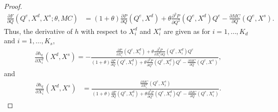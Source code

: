 \documentclass[11pt, a4paper]{article}
\theoremstyle{remark}
\begin{document}
\begin{proof}
\begin{align}
    \frac{\partial F}{\partial Q}(Q^e, X^{d}, X^{s}; \theta, MC) & = (1+\theta)\frac{\partial P}{\partial Q}(Q^e, X^{d}) + \theta\frac{\partial^2 P}{\partial Q^2}(Q^e, X^{d})Q^e - \frac{\partial MC}{\partial Q}(Q^e, X^{s}).
\end{align}
Thus, the derivative of $h$ with respect to $X^{d}_i$ and $X^{s}_i$ are given as for $i = 1, \ldots, K_d$ and $i = 1, \ldots, K_s$,
\begin{align}
    \frac{\partial h_q}{\partial X^{d}_{i}}(X^{d}, X^{s}) = -\frac{\frac{\partial P}{\partial X^{d}_{i}}(Q^e, X^{d}_i) + \theta\frac{\partial^2 P}{\partial X^{d}_{i}\partial Q}(Q^e, X^{d}_i)Q^e }{(1+\theta)\frac{\partial P}{\partial Q}(Q^e, X^{d}_i) + \theta\frac{\partial^2 P}{\partial Q^2}(Q^e, X^{d}_i)Q^e - \frac{\partial MC}{\partial Q}(Q^e, X^{s})}, \label{eq:foc_derivative_demand}
\end{align}
and
\begin{align}
    \frac{\partial h_q}{\partial X^{s}_{i}}(X^{d}, X^{s}) & = \frac{\frac{\partial MC}{\partial X^{s}_{i}}(Q^e, X^{s}_i)}{(1+\theta)\frac{\partial P}{\partial Q}(Q^e, X^{d}_i) + \theta\frac{\partial^2 P}{\partial Q^2}(Q^e, X^{d}_i)Q^e - \frac{\partial MC}{\partial Q}(Q^e, X^{s}_i)}. \label{eq:foc_derivative_supply}
\end{align}


\end{proof}
\end{document}
